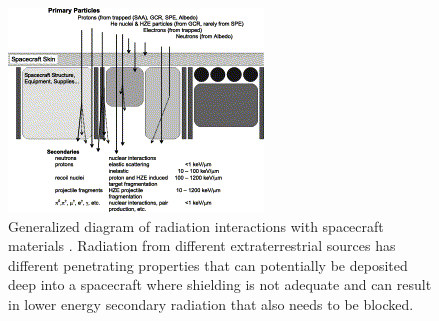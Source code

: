 \begin{figure}
\centering
\includegraphics[scale=0.5]{shield-transport.png}
\caption{Generalized diagram of radiation interactions with spacecraft materials \cite{bentonbenton}. Radiation from different extraterrestrial sources has different penetrating properties that can potentially be deposited deep into a spacecraft where shielding is not adequate and can result in lower energy secondary radiation that also needs to be blocked.}
\label{fig:shield-transport }
\end{figure}

